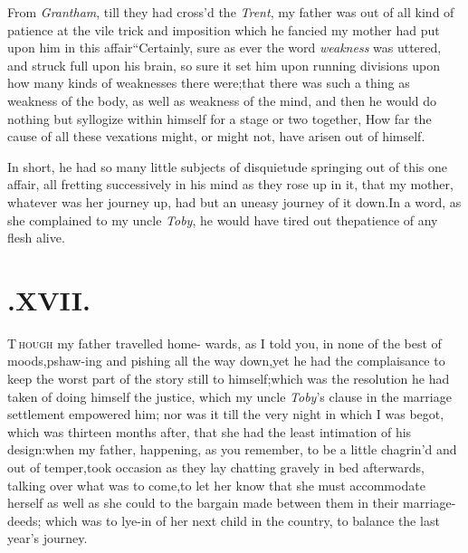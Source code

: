 \documentclass{article}
\begin{document}
From \textit{Grantham}, till they had cross’d the
\textit{Trent}, my father was out of all kind of patience at the vile
trick and imposition which he fancied my mother had put upon him in
this affair\tsk  “Certainly,\break 
{} 
sure as ever the word \textit{weakness} was uttered, and
struck full upon his brain,\tsh\break
so sure it set him upon running divisions upon how
many kinds of weaknesses there were;\tsh  that there was\break 
such a thing as weakness of the body,\break
\tsh  as well as weakness of the mind,\tsk\break
and then he would do nothing but syl\-logize within himself for a stage or
two
together, How far the cause of all these\break
vexations might, or might not, have\break
arisen out of himself.

In short, he had so many little subjects of disquietude
springing out of this one affair, all fretting successively in his
mind as they rose up in it, that my mother, whatever was her
journey up, had but an uneasy journey of it down.\tsh\break  In a
word, as she complained to my uncle \textit{Toby}, he would have
tired out the\break patience of any flesh alive.

\section{.\enspace XVII.}

\lettrine{T}{\,hough} my father travelled home-\break
wards, as I told you, in none of\break
the best of moods,\tsk  pshaw-ing and
pish\-ing all the way down,\tsk  yet he had the complaisance to keep
the worst part of the story still to himself;\tsh  which was the
resolution he had taken of doing himself the justice, which my
uncle \textit{Toby}’s clause in the marriage settlement
empowered him; nor was it till the very night in which I was begot,
which was thirteen months after, that she had the least intimation
of his design:\tsh when my father, happening, as you remember, to be a
little chagrin’d and out of temper,\tsh  took
occasion as they lay chatting gravely in bed afterwards, talking
over what was to come,\tsh  to let her know that she must
accommodate herself as well as she could to the bargain made
between them in their marriage-deeds; which was to lye-in of her
next child in the country, to balance the last year’s
journey.\\
\end{document}

